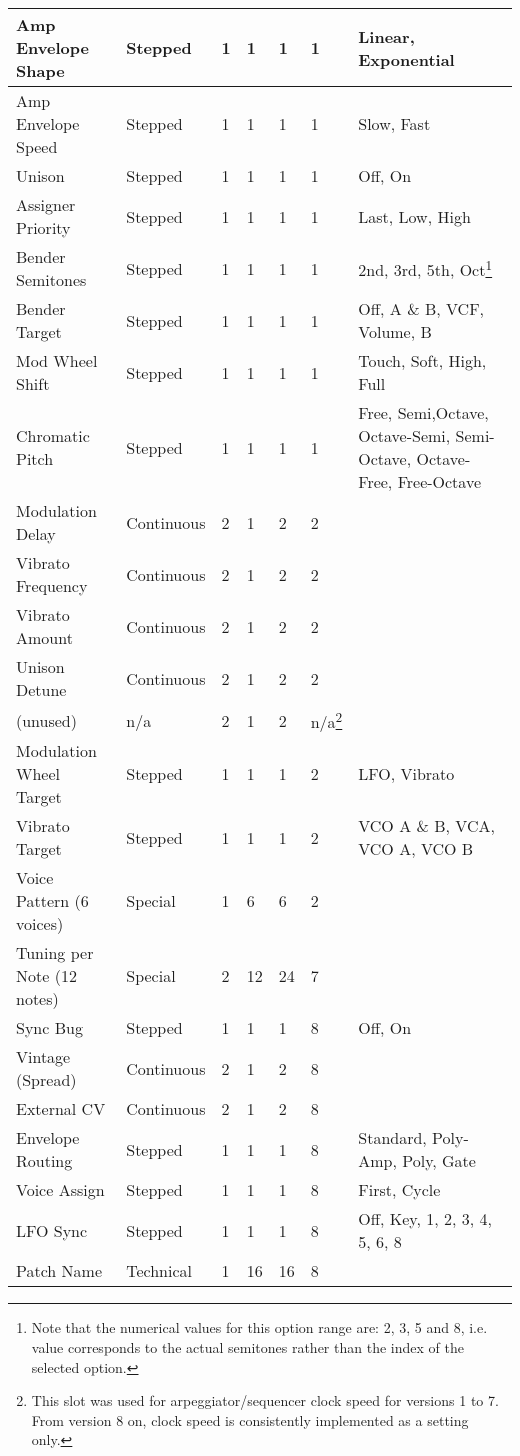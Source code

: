 \begin{longtable}[l]{p{5cm}|p{2cm}|p{1.5cm}|p{1.5cm}|p{2cm}|p{2.2cm}|p{5cm}}
Amp Envelope Shape & Stepped & 1 & 1 & 1 & 1 & Linear, Exponential \\ \hline
Amp Envelope Speed & Stepped & 1 & 1 & 1 & 1 & Slow, Fast \\ \hline
Unison & Stepped & 1 & 1 & 1 & 1 & Off, On \\ \hline
Assigner Priority & Stepped & 1 & 1 & 1 & 1 & Last, Low, High \\ \hline
Bender Semitones & Stepped & 1 & 1 & 1 & 1 & 2nd, 3rd, 5th, Oct\footnote{Note that the numerical values for this option range are: 2, 3, 5 and 8, i.e. value corresponds to the actual semitones rather than the index of the selected option.} \\ \hline
Bender Target & Stepped & 1 & 1 & 1 & 1 & Off, A \& B, VCF, Volume, B \\ \hline
Mod Wheel Shift & Stepped & 1 & 1 & 1 & 1 & Touch, Soft, High, Full \\ \hline
Chromatic Pitch & Stepped & 1 & 1 & 1 & 1 & Free, Semi,Octave, Octave-Semi, Semi-Octave, Octave-Free, Free-Octave \\ \hline
Modulation Delay & Continuous & 2 & 1 & 2 & 2 &  \\ \hline
Vibrato Frequency & Continuous & 2 & 1 & 2 & 2 &  \\ \hline
Vibrato Amount & Continuous & 2 & 1 & 2 & 2 &  \\ \hline
Unison Detune & Continuous & 2 & 1 & 2 & 2 &  \\ \hline
(unused) & n/a & 2 & 1 & 2 & n/a\footnote{This slot was used for arpeggiator/sequencer clock speed for versions 1 to 7. From version 8 on, clock speed is consistently implemented as a setting only.} &  \\ \hline
Modulation Wheel Target & Stepped & 1 & 1 & 1 & 2 & LFO, Vibrato \\ \hline
Vibrato Target & Stepped & 1 & 1 & 1 & 2 & VCO A \& B, VCA, VCO A, VCO B \\ \hline
Voice Pattern (6 voices) & Special & 1 & 6 & 6 & 2 &  \\ \hline
Tuning per Note (12 notes) & Special & 2 & 12 & 24 & 7 &  \\ \hline
Sync Bug & Stepped & 1 & 1 & 1 & 8 & Off, On \\ \hline
Vintage (Spread) & Continuous & 2 & 1 & 2 & 8 &  \\ \hline
External CV & Continuous & 2 & 1 & 2 & 8 &  \\ \hline
Envelope Routing & Stepped & 1 & 1 & 1 & 8 & Standard, Poly-Amp, Poly, Gate \\ \hline
Voice Assign & Stepped & 1 & 1 & 1 & 8 & First, Cycle \\ \hline
LFO Sync & Stepped & 1 & 1 & 1 & 8 & Off, Key, 1, 2, 3, 4, 5, 6, 8 \\ \hline
Patch Name & Technical & 1 & 16 & 16 & 8 &  \\ \hline




\end{longtable}


